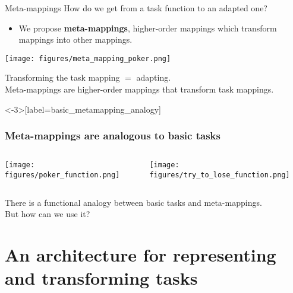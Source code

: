 \documentclass{beamer}
\begin{document}
\begin{frame}{Meta-mappings}
How do we get from a task function to an adapted one?
\begin{itemize}
\item We propose \textbf{meta-mappings}, higher-order mappings which transform mappings into other mappings.
\end{itemize}
\texttt{[image: figures/meta\_mapping\_poker.png]}
\end{frame}

\begin{frame}[standout]
Transforming the task mapping \(=\) adapting. \\[1em]
Meta-mappings are higher-order mappings that transform task mappings.
\end{frame}

\begin{frame}<-3>[label=basic_metamapping_analogy]
\frametitle{Meta-mappings are analogous to basic tasks}
\begin{columns}
\begin{column}{0.5\textwidth}
\vspace{2em}
\texttt{[image: figures/poker\_function.png]}
\end{column}
\begin{column}{0.5\textwidth}
\vspace{2em}
\texttt{[image: figures/try\_to\_lose\_function.png]}
\end{column}
\end{columns}
\end{frame}

\begin{frame}[standout]
There is a functional analogy between basic tasks and meta-mappings. \\[1em]
But how can we use it?
\end{frame}

\section{An architecture for representing and transforming tasks}
\end{document}
